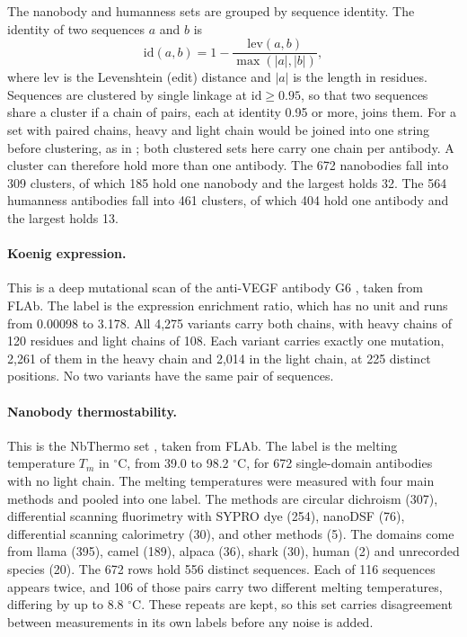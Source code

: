The nanobody and humanness sets are grouped by sequence identity. The identity of two sequences $a$ and $b$ is
\begin{equation}
\mathrm{id}(a,b) = 1 - \frac{\mathrm{lev}(a,b)}{\max(|a|,|b|)},
\end{equation}
where $\mathrm{lev}$ is the Levenshtein (edit) distance and $|a|$ is the length in residues. Sequences are clustered by single linkage at $\mathrm{id} \ge 0.95$, so that two sequences share a cluster if a chain of pairs, each at identity 0.95 or more, joins them. For a set with paired chains, heavy and light chain would be joined into one string before clustering, as in \citet{Kenlay2024}; both clustered sets here carry one chain per antibody. A cluster can therefore hold more than one antibody. The 672 nanobodies fall into 309 clusters, of which 185 hold one nanobody and the largest holds 32. The 564 humanness antibodies fall into 461 clusters, of which 404 hold one antibody and the largest holds 13.

\paragraph{Koenig expression.} This is a deep mutational scan of the anti-VEGF antibody G6 \citep{Koenig2017}, taken from FLAb. The label is the expression enrichment ratio, which has no unit and runs from 0.00098 to 3.178. All 4,275 variants carry both chains, with heavy chains of 120 residues and light chains of 108. Each variant carries exactly one mutation, 2,261 of them in the heavy chain and 2,014 in the light chain, at 225 distinct positions. No two variants have the same pair of sequences.

\paragraph{Nanobody thermostability.} This is the NbThermo set \citep{ValdesTresanco2023}, taken from FLAb. The label is the melting temperature $T_m$ in $^\circ$C, from 39.0 to 98.2 $^\circ$C, for 672 single-domain antibodies with no light chain. The melting temperatures were measured with four main methods and pooled into one label. The methods are circular dichroism (307), differential scanning fluorimetry with SYPRO dye (254), nanoDSF (76), differential scanning calorimetry (30), and other methods (5). The domains come from llama (395), camel (189), alpaca (36), shark (30), human (2) and unrecorded species (20). The 672 rows hold 556 distinct sequences. Each of 116 sequences appears twice, and 106 of those pairs carry two different melting temperatures, differing by up to 8.8 $^\circ$C. These repeats are kept, so this set carries disagreement between measurements in its own labels before any noise is added.


